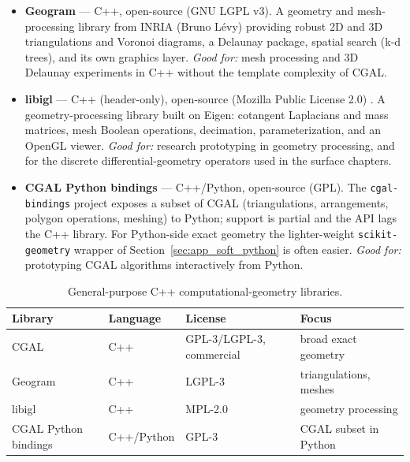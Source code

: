 \begin{itemize}
    Chapter~\ref{ch:mesh_generation}. \emph{Good for:} high-quality
    meshes with rigorous guarantees on element shape.
  \item \textbf{Geogram} --- C++, open-source (GNU LGPL v3). A geometry
    and mesh-processing library from INRIA (Bruno L\'evy) providing
    robust 2D and 3D triangulations and Voronoi diagrams, a Delaunay
    package, spatial search (k-d trees), and its own graphics layer.
    \cite{geogram} \emph{Good for:} mesh processing and 3D Delaunay
    experiments in C++ without the template complexity of CGAL.
  \item \textbf{libigl} --- C++ (header-only), open-source (Mozilla
    Public License 2.0) \cite{libigl}. A geometry-processing library
    built on Eigen: cotangent Laplacians and mass matrices, mesh Boolean
    operations, decimation, parameterization, and an OpenGL viewer.
    \emph{Good for:} research prototyping in geometry processing, and
    for the discrete differential-geometry operators used in the surface
    chapters.
  \item \textbf{CGAL Python bindings} --- C++/Python, open-source (GPL).
    The \texttt{cgal-bindings} project exposes a subset of CGAL
    (triangulations, arrangements, polygon operations, meshing) to
    Python; support is partial and the API lags the C++ library. For
    Python-side exact geometry the lighter-weight \texttt{scikit-geometry}
    wrapper of Section~\ref{sec:app_soft_python} is often easier.
    \emph{Good for:} prototyping CGAL algorithms interactively from
    Python.
\end{itemize}

\begin{table}[ht]
\centering
\begin{tabular}{llll}
\hline
\textbf{Library} & \textbf{Language} & \textbf{License} & \textbf{Focus} \\
\hline
CGAL            & C++       & GPL-3/LGPL-3, commercial & broad exact geometry \\
Geogram         & C++       & LGPL-3                   & triangulations, meshes \\
libigl          & C++       & MPL-2.0                 & geometry processing \\
CGAL Python bindings & C++/Python & GPL-3              & CGAL subset in Python \\
\hline
\end{tabular}
\caption{General-purpose C++ computational-geometry libraries.}
\label{tbl:appsoft_cgal}
\end{table}

